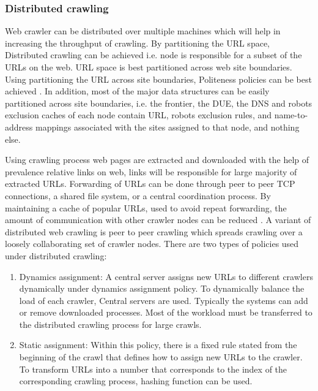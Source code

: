 \documentclass[article,type=msc,colorback,accentcolor=tud9c,twoside,11pt]{tudthesis}
\begin{document}
	\subsubsection{Distributed crawling}
	
	Web crawler can be distributed over multiple machines which will help in increasing the throughput of crawling. By partitioning the URL space, Distributed crawling can be achieved  i.e. node is responsible for a subset of the URLs on the web. URL space is best partitioned across web site boundaries. Using partitioning the URL across site boundaries, Politeness policies can be best achieved . In addition, most of the major data structures can be easily partitioned across site boundaries, i.e. the frontier, the DUE, the DNS and robots exclusion caches of each node contain URL, robots exclusion rules, and name-to-address mappings associated with the sites assigned to that node, and nothing else.
	
	Using crawling process web pages are extracted and downloaded  with the help of prevalence relative links on web, links will be responsible for large majority of extracted URLs. Forwarding of URLs can be done through peer to peer TCP connections\cite{Highperformancewebcrawling}, a shared file system\cite{Highperformance}, or a central coordination process\cite{anatomy}. By maintaining a cache of popular URLs, used to avoid repeat forwarding\cite{Graphstructure}, the amount of communication with other crawler nodes can be reduced . A variant of distributed web crawling is peer to peer crawling which spreads crawling over a loosely collaborating set of crawler nodes. There are two types of policies used under distributed crawling:
	\begin{enumerate}
		\item Dynamics assignment: A central server assigns new URLs to different crawlers dynamically under dynamics assignment policy. To dynamically balance the load of each crawler, Central servers are used. Typically the systems can add or remove downloaded processes. Most of the workload must be transferred to the distributed crawling process for large crawls.
		\item Static assignment: Within this policy, there is a fixed rule stated from the beginning of the crawl that defines how to assign new URLs to the crawler. To transform URLs into a number that corresponds to the index of the corresponding crawling process, hashing function can be used.
	\end{enumerate}
\end{document}

